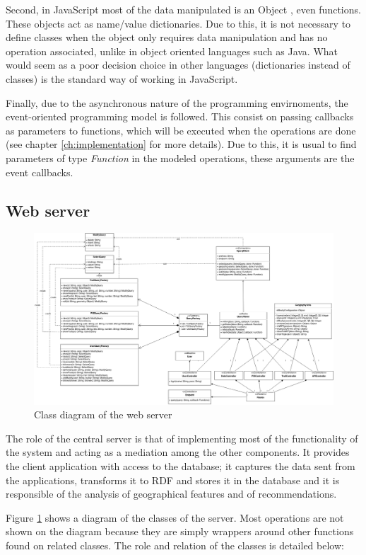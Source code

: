 Second, in JavaScript most of the data manipulated is an Object , even functions. These objects act as name/value dictionaries. Due to this, it is not necessary to define classes when the object only requires data manipulation and has no operation associated, unlike in object oriented languages such as Java. What would seem as a poor decision choice in other languages (dictionaries instead of classes) is the standard way of working in JavaScript.

Finally, due to the asynchronous nature of the programming envirnoments, the event-oriented programming model is followed. This consist on passing callbacks as parameters to functions, which will be executed when the operations are done (see chapter \ref{ch:implementation} for more details). Due to this, it is usual to find parameters of type \textit{Function} in the modeled operations, these arguments are the event callbacks.

\subsection{Web server}

\begin{figure}[ht]
  \centering
  \includegraphics[angle=270,width=.8\textwidth]{fig/server-diagram}
  \caption{Class diagram of the web server}
  \label{fig:server-diagram}
\end{figure}

The role of the central server is that of implementing most of the functionality of the system and acting as a mediation among the other components. It provides the client application with access to the database; it captures the data sent from the applications, transforms it to RDF and stores it in the database and it is responsible of the analysis of geographical features and of recommendations.

Figure \ref{fig:server-diagram} shows a diagram of the classes of the server. Most operations are not shown on the diagram because they are simply wrappers around other functions found on related classes. The role and relation of the classes is detailed below:

